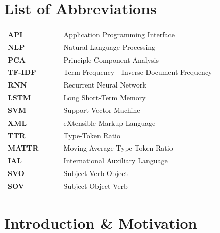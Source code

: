 \documentclass[12pt,a4paper]{article}
\numberwithin{figure}{section}
\numberwithin{table}{section}
\numberwithin{definition}{section}
\begin{document}
\section*{List of Abbreviations}

\begin{tabular}{lcl}
\textbf{API} & ~~~ & Application Programming Interface \\
\textbf{NLP} & ~~~ & Natural Language Processing \\
\textbf{PCA} & ~~~ & Principle Component Analysis \\
\textbf{TF-IDF} & ~~~ & Term Frequency - Inverse Document Frequency \\
\textbf{RNN} & ~~~ & Recurrent Neural Network \\
\textbf{LSTM} & ~~~ & Long Short-Term Memory \\
\textbf{SVM} & ~~~ & Support Vector Machine \\
\textbf{XML} & ~~~ & eXtensible Markup Language \\
\textbf{TTR} & ~~~ & Type-Token Ratio \\
\textbf{MATTR} & ~~~ & Moving-Average Type-Token Ratio \\
\textbf{IAL} & ~~~ & International Auxiliary Language \\
\textbf{SVO} & ~~~ & Subject-Verb-Object \\
\textbf{SOV} & ~~~ & Subject-Object-Verb \\


\end{tabular}
\newpage


\pagestyle{fancy}
\fancyhf{}
\fancyhead[L]{\textcolor{gray}{\slshape\nouppercase{\rightmark}}}
\fancyhead[R]{\thepage}
\fancyfoot[R]{\textcolor{gray}{Seminar für Sprachwissenschaft Universität Tübingen}}
\renewcommand{\headrulewidth}{0.4pt}

\renewcommand{\headrulewidth}{0.5pt}
\renewcommand{\footrulewidth}{0.5pt}



\setcounter{page}{1}

\section{Introduction \& Motivation} 
\label{sec:intro}
\end{document}
